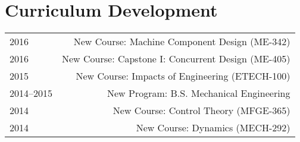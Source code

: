 \section*{Curriculum Development}
\begin{tabular}{L!{\VRule}R}
2016&New Course: Machine Component Design (ME-342)\\
2016&New Course: Capstone I: Concurrent Design (ME-405)\\
2015&New Course: Impacts of Engineering (ETECH-100)\\
2014--2015&New Program: B.S. Mechanical Engineering\\
2014&New Course: Control Theory (MFGE-365)\\
2014&New Course: Dynamics (MECH-292)\\
\end{tabular}